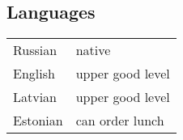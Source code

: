 \documentclass[10pt]{article}
\begin{document}
\begin{multicols*}{2}
\subsection*{Languages}
\begin{tabular}{ll}
    Russian & native \\
    English & upper good level \\
    Latvian & upper good level \\
    Estonian & can order lunch \\
\end{tabular}
\end{multicols*}
\end{document}
